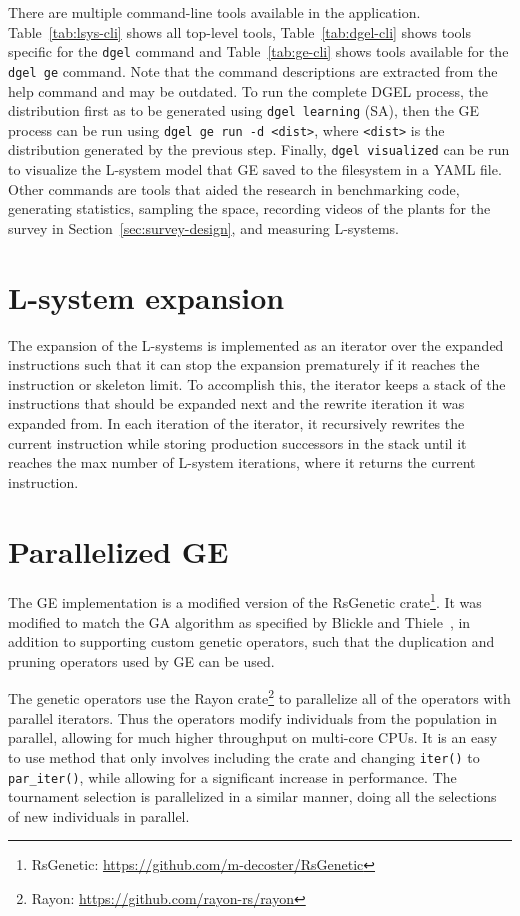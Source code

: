 There are multiple command-line tools available in the application.
Table~\ref{tab:lsys-cli} shows all top-level tools, Table~\ref{tab:dgel-cli} shows tools specific for the \texttt{dgel} command and Table~\ref{tab:ge-cli} shows tools available for the \texttt{dgel ge} command.
Note that the command descriptions are extracted from the help command and may be outdated.
To run the complete DGEL process, the distribution first as to be generated using \texttt{dgel learning} (\gls{SA}), then the \gls{GE} process can be run using \texttt{dgel ge run -d <dist>}, where \texttt{<dist>} is the distribution generated by the previous step.
Finally, \texttt{dgel visualized} can be run to visualize the L-system model that \gls{GE} saved to the filesystem in a YAML file.
Other commands are tools that aided the research in benchmarking code, generating statistics, sampling the space, recording videos of the plants for the survey in Section~\ref{sec:survey-design}, and measuring L-systems.

\section{L-system expansion}
The expansion of the \glspl{L-system} is implemented as an iterator over the expanded instructions such that it can stop the expansion prematurely if it reaches the instruction or skeleton limit.
To accomplish this, the iterator keeps a stack of the instructions that should be expanded next and the rewrite iteration it was expanded from.
In each iteration of the iterator, it recursively rewrites the current instruction while storing production successors in the stack until it reaches the max number of \gls{L-system} iterations, where it returns the current instruction.

\section[Parallelized GE]{Parallelized \gls{GE}}
The \gls{GE} implementation is a modified version of the RsGenetic crate\footnote{RsGenetic: \url{https://github.com/m-decoster/RsGenetic}}.
It was modified to match the \gls{GA} algorithm as specified by Blickle and Thiele~\cite{1995Blickle}, in addition to supporting custom genetic operators, such that the duplication and pruning operators used by \gls{GE} can be used.

The genetic operators use the Rayon crate\footnote{Rayon: \url{https://github.com/rayon-rs/rayon}} to parallelize all of the operators with parallel iterators.
Thus the operators modify individuals from the population in parallel, allowing for much higher throughput on multi-core CPUs.
It is an easy to use method that only involves including the crate and changing \texttt{iter()} to \texttt{par\_iter()}, while allowing for a significant increase in performance.
The tournament selection is parallelized in a similar manner, doing all the selections of new individuals in parallel.

